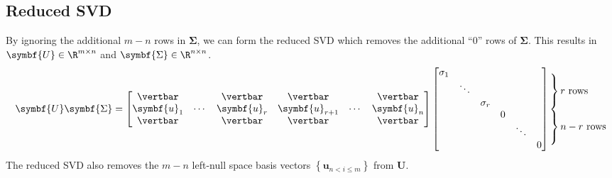 \documentclass{article}
\begin{document}
\subsection{Reduced SVD}
By ignoring the additional \(m - n\) rows in \(\symbf{\Sigma}\), we can
form the reduced SVD which removes the additional ``0'' rows of
\(\symbf{\Sigma}\). This results in \(\symbf{U} \in \R^{m \times n}\)
and \(\symbf{\Sigma} \in \R^{n \times n}\).
\begin{equation*}
    \symbf{U} \symbf{\Sigma} =
    \begin{bmatrix}
        \vertbar    &        & \vertbar    & \vertbar        &        & \vertbar    \\
        \symbf{u}_1 & \cdots & \symbf{u}_r & \symbf{u}_{r+1} & \cdots & \symbf{u}_n \\
        \vertbar    &        & \vertbar    & \vertbar        &        & \vertbar
    \end{bmatrix}
    \begin{bmatrix}
        \sigma_1 &        &          &   &        &   \\
                 & \ddots &          &   &        &   \\
                 &        & \sigma_r &   &        &   \\
                 &        &          & 0 &        &   \\
                 &        &          &   & \ddots &   \\
                 &        &          &   &        & 0
    \end{bmatrix}
    \setlength{\arraycolsep}{0pt}
    \begin{array}{ l }
        \left.\kern-\nulldelimiterspace
        \vphantom{
            \begin{array}{ c }
                0 \\
                0 \\
                0
            \end{array}
        }
        \right\}\text{\(r\) rows} \\
        \left.\kern-\nulldelimiterspace
        \vphantom{
            \begin{array}{ c }
                0 \\
                0 \\
                0
            \end{array}
        }
        \right\}\text{\(n - r\) rows}
    \end{array}
\end{equation*}
The reduced SVD also removes the \(m - n\) left-null space basis vectors \(\left\{ \symbf{u}_{n < i \leq m} \right\}\) from \(\symbf{U}\).
\end{document}
